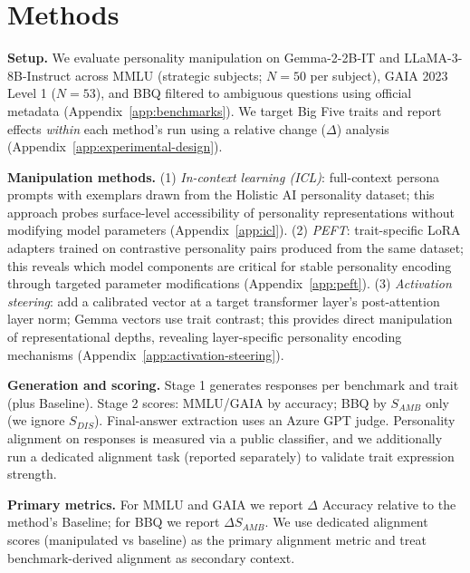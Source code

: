 \section{Methods}

\textbf{Setup.} We evaluate personality manipulation on Gemma-2-2B-IT and LLaMA-3-8B-Instruct across MMLU (strategic subjects; \(N=50\) per subject), GAIA 2023 Level 1 (\(N=53\)), and BBQ filtered to ambiguous questions using official metadata (Appendix~\ref{app:benchmarks}). We target Big Five traits and report effects \emph{within} each method's run using a relative change (\(\Delta\)) analysis (Appendix~\ref{app:experimental-design}).

\textbf{Manipulation methods.} (1) \emph{In-context learning (ICL)}: full-context persona prompts with exemplars drawn from the Holistic AI personality dataset; this approach probes surface-level accessibility of personality representations without modifying model parameters (Appendix~\ref{app:icl}). (2) \emph{PEFT}: trait-specific LoRA adapters trained on contrastive personality pairs produced from the same dataset; this reveals which model components are critical for stable personality encoding through targeted parameter modifications (Appendix~\ref{app:peft}). (3) \emph{Activation steering}: add a calibrated vector at a target transformer layer's post-attention layer norm; Gemma vectors use trait contrast; this provides direct manipulation of representational depths, revealing layer-specific personality encoding mechanisms (Appendix~\ref{app:activation-steering}).

\textbf{Generation and scoring.} Stage 1 generates responses per benchmark and trait (plus Baseline). Stage 2 scores: MMLU/GAIA by accuracy; BBQ by \(S_{AMB}\) only (we ignore \(S_{DIS}\)). Final-answer extraction uses an Azure GPT judge. Personality alignment on responses is measured via a public classifier, and we additionally run a dedicated alignment task (reported separately) to validate trait expression strength.

\textbf{Primary metrics.} For MMLU and GAIA we report \(\Delta\) Accuracy relative to the method's Baseline; for BBQ we report \(\Delta S_{AMB}\). We use dedicated alignment scores (manipulated vs baseline) as the primary alignment metric and treat benchmark-derived alignment as secondary context.